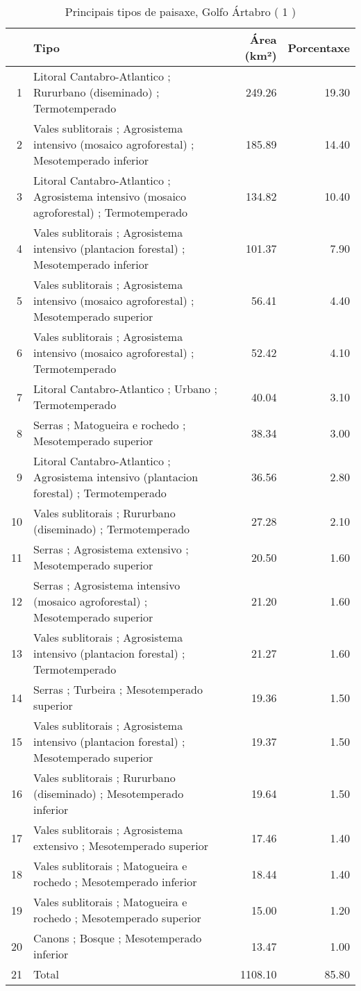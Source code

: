 \begin{table}[p]
\centering
\caption{Principais tipos de paisaxe,  Golfo Ártabro ( 1 )} 
\label{Tipos 1}
\begin{tabular}{rlrr}
  \hline
 & Tipo & Área (km²) & Porcentaxe \\ 
  \hline
1 & Litoral Cantabro-Atlantico ; Rururbano (diseminado) ; Termotemperado & 249.26 & 19.30 \\ 
  2 & Vales sublitorais ; Agrosistema intensivo (mosaico agroforestal) ; Mesotemperado inferior & 185.89 & 14.40 \\ 
  3 & Litoral Cantabro-Atlantico ; Agrosistema intensivo (mosaico agroforestal) ; Termotemperado & 134.82 & 10.40 \\ 
  4 & Vales sublitorais ; Agrosistema intensivo (plantacion forestal) ; Mesotemperado inferior & 101.37 & 7.90 \\ 
  5 & Vales sublitorais ; Agrosistema intensivo (mosaico agroforestal) ; Mesotemperado superior & 56.41 & 4.40 \\ 
  6 & Vales sublitorais ; Agrosistema intensivo (mosaico agroforestal) ; Termotemperado & 52.42 & 4.10 \\ 
  7 & Litoral Cantabro-Atlantico ; Urbano ; Termotemperado & 40.04 & 3.10 \\ 
  8 & Serras ; Matogueira e rochedo ; Mesotemperado superior & 38.34 & 3.00 \\ 
  9 & Litoral Cantabro-Atlantico ; Agrosistema intensivo (plantacion forestal) ; Termotemperado & 36.56 & 2.80 \\ 
  10 & Vales sublitorais ; Rururbano (diseminado) ; Termotemperado & 27.28 & 2.10 \\ 
  11 & Serras ; Agrosistema extensivo ; Mesotemperado superior & 20.50 & 1.60 \\ 
  12 & Serras ; Agrosistema intensivo (mosaico agroforestal) ; Mesotemperado superior & 21.20 & 1.60 \\ 
  13 & Vales sublitorais ; Agrosistema intensivo (plantacion forestal) ; Termotemperado & 21.27 & 1.60 \\ 
  14 & Serras ; Turbeira ; Mesotemperado superior & 19.36 & 1.50 \\ 
  15 & Vales sublitorais ; Agrosistema intensivo (plantacion forestal) ; Mesotemperado superior & 19.37 & 1.50 \\ 
  16 & Vales sublitorais ; Rururbano (diseminado) ; Mesotemperado inferior & 19.64 & 1.50 \\ 
  17 & Vales sublitorais ; Agrosistema extensivo ; Mesotemperado superior & 17.46 & 1.40 \\ 
  18 & Vales sublitorais ; Matogueira e rochedo ; Mesotemperado inferior & 18.44 & 1.40 \\ 
  19 & Vales sublitorais ; Matogueira e rochedo ; Mesotemperado superior & 15.00 & 1.20 \\ 
  20 & Canons ; Bosque ; Mesotemperado inferior & 13.47 & 1.00 \\ 
  21 & Total & 1108.10 & 85.80 \\ 
   \hline
\end{tabular}
\end{table}
